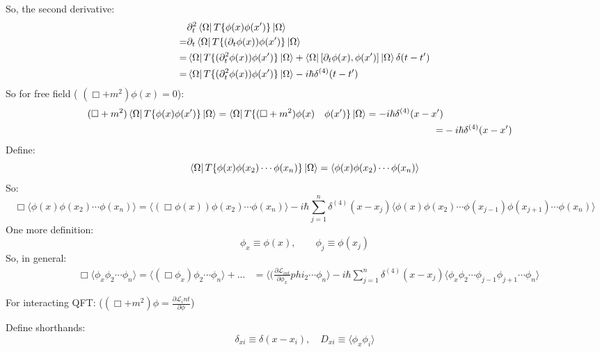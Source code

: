 So, the second derivative:
\[
    \begin{aligned}
	&\partial_t^2\bra{\Omega}T\{\phi(x)\phi(x')\}\ket{\Omega}	    \\
	=& \partial_t\bra{\Omega}T\{(\partial_t\phi(x))\phi(x')\}\ket{\Omega}	    \\
	=& \bra{\Omega}T\{(\partial_t^2\phi(x))\phi(x')\}\ket{\Omega} + \bra{\Omega}[\partial_t\phi(x), \phi(x')]\ket{\Omega}\delta(t-t')	\\
	=& \bra{\Omega}T\{(\partial_t^2\phi(x))\phi(x')\}\ket{\Omega} -i\hbar\delta^{(4)}(t-t') \\
    \end{aligned}
    \]
So for free field ( $(\Box+m^2)\phi(x) = 0$):
\[
    \begin{aligned}
    (\Box+m^2)\bra{\Omega}T\{\phi(x)\phi(x')\}\ket{\Omega} = \bra{\Omega}T\{(\Box+m^2)\phi(x)\quad\phi(x')\}\ket{\Omega} = -i\hbar\delta^{(4)}(x-x')\\
    =& -i\hbar\delta^{(4)}(x-x')
    \end{aligned}
    \]
Define:
\begin{equation}
    \bra{\Omega}T\{\phi(x)\phi(x_2)\cdots\phi(x_n)\}\ket{\Omega} = \langle\phi(x)\phi(x_2)\cdots\phi(x_n)\rangle	\\
\end{equation}
So:
\[
    \Box\langle\phi(x)\phi(x_2)\cdots\phi(x_n)\rangle = \langle(\Box\phi(x))\phi(x_2)\cdots\phi(x_n)\rangle 
    -i\hbar\displaystyle\sum_{j=1}^{n}\delta^{(4)}(x-x_j)\langle\phi(x)\phi(x_2)\cdots\phi(x_{j-1})\phi(x_{j+1})\cdots\phi(x_n)\rangle
    \]
One more definition:
\begin{equation}
    \phi_x \equiv \phi(x), \qquad \phi_j \equiv \phi(x_j)
\end{equation}
So, in general:
\[
    \begin{aligned}
	&\Box\langle\phi_x\phi_2\cdots\phi_n\rangle = \langle(\Box\phi_x)\phi_2\cdots\phi_n\rangle + ...
	&= \langle(\frac{\partial\mathcal{L}_{int}}{\partial\phi_x}phi_2\cdots\phi_n\rangle - i\hbar\displaystyle\sum_{j=1}^{n}\delta^{(4)}(x-x_j)\langle\phi_x\phi_2\cdots\phi_{j-1}\phi_{j+1}\cdots\phi_n\rangle
    \end{aligned}
    \]

For interacting QFT: ($(\Box+m^2)\phi = \frac{\partial\mathcal{L}_int}{\partial\phi}$)


Define shorthands:
\begin{equation}
    \delta_{xi} \equiv \delta(x-x_i), \quad D_{xi} \equiv \langle\phi_x\phi_i\rangle
\end{equation}

